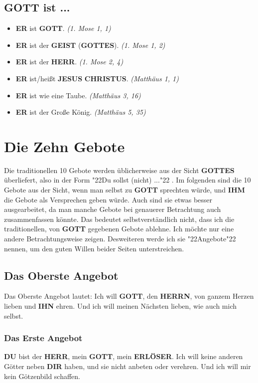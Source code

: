 \documentclass[10pt,a5paper]{article}
\newcommand{\Christus}[0]{\textbf{CHRISTUS}}
\newcommand{\Dir}[0]{\textbf{DIR}}
\newcommand{\Du}[0]{\textbf{DU}}
\newcommand{\Erloeser}[0]{\textbf{ERL\"OSER}}
\newcommand{\Er}[0]{\textbf{ER}}
\newcommand{\Geist}[0]{\textbf{GEIST}}
\newcommand{\Gottes}[0]{\textbf{GOTTES}}
\newcommand{\Gott}[0]{\textbf{GOTT}}
\newcommand{\Herrn}[0]{\textbf{HERRN}}
\newcommand{\Herr}[0]{\textbf{HERR}}
\newcommand{\Ihm}[0]{\textbf{IHM}}
\newcommand{\Ihn}[0]{\textbf{IHN}}
\newcommand{\Jesus}[0]{\textbf{JESUS}}
\newcommand{\q}[1]{\char"22{#1}\char"22 }
\begin{document}
	\subsection{{\Gott} ist ...}
		\begin{itemize}[nosep]
			\item {\Er} ist {\Gott}. \textit{(1. Mose 1, 1)}
			\item {\Er} ist der {\Geist} ({\Gottes}). \textit{(1. Mose 1, 2)}
			\item {\Er} ist der {\Herr}. \textit{(1. Mose 2, 4)}
			\item {\Er} ist/hei{\ss}t {\Jesus} {\Christus}. \textit{(Matth\"aus 1, 1)}
			\item {\Er} ist wie eine Taube. \textit{(Matth\"aus 3, 16)}
			\item {\Er} ist der Gro{\ss}e K\"onig. \textit{(Matth\"aus 5, 35)}
		\end{itemize}
		
	\newpage
	\section{Die Zehn Gebote}
		Die traditionellen 10 Gebote werden \"ublicherweise aus der Sicht {\Gottes} \"uberliefert,
		also in der Form \q{Du sollst (nicht) ...}.
		Im folgenden sind die 10 Gebote aus der Sicht,
		wenn man selbst zu {\Gott} sprechten w\"urde,
		und {\Ihm} die Gebote als Versprechen geben w\"urde.
		Auch sind sie etwas besser ausgearbeitet,
		da man manche Gebote bei genauerer Betrachtung auch zusammenfassen k\"onnte.
		Das bedeutet selbstverst\"andlich nicht,
		dass ich die traditionellen,
		von {\Gott} gegebenen Gebote ablehne.
		Ich m\"ochte nur eine andere Betrachtungsweise zeigen.
		Desweiteren werde ich sie \q{Angebote} nennen,
		um den guten Willen beider Seiten unterstreichen.
	
	\subsection{Das Oberste Angebot}
		Das Oberste Angebot lautet:
		Ich will {\Gott}, den {\Herrn}, von ganzem Herzen lieben und {\Ihn} ehren. Und ich will meinen N\"achsten lieben, wie auch mich selbst.
		
	\subsubsection{Das Erste Angebot}
		{\Du} bist der {\Herr},
		mein {\Gott},
		mein {\Erloeser}.
		Ich will keine anderen G\"otter neben {\Dir} haben,
		und sie nicht anbeten oder verehren.
		Und ich will mir kein G\"otzenbild schaffen.
		
\end{document}
